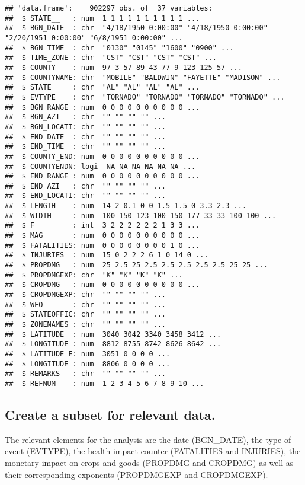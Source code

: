 \documentclass[
]{article}
\begin{document}
\begin{verbatim}
## 'data.frame':    902297 obs. of  37 variables:
##  $ STATE__   : num  1 1 1 1 1 1 1 1 1 1 ...
##  $ BGN_DATE  : chr  "4/18/1950 0:00:00" "4/18/1950 0:00:00" "2/20/1951 0:00:00" "6/8/1951 0:00:00" ...
##  $ BGN_TIME  : chr  "0130" "0145" "1600" "0900" ...
##  $ TIME_ZONE : chr  "CST" "CST" "CST" "CST" ...
##  $ COUNTY    : num  97 3 57 89 43 77 9 123 125 57 ...
##  $ COUNTYNAME: chr  "MOBILE" "BALDWIN" "FAYETTE" "MADISON" ...
##  $ STATE     : chr  "AL" "AL" "AL" "AL" ...
##  $ EVTYPE    : chr  "TORNADO" "TORNADO" "TORNADO" "TORNADO" ...
##  $ BGN_RANGE : num  0 0 0 0 0 0 0 0 0 0 ...
##  $ BGN_AZI   : chr  "" "" "" "" ...
##  $ BGN_LOCATI: chr  "" "" "" "" ...
##  $ END_DATE  : chr  "" "" "" "" ...
##  $ END_TIME  : chr  "" "" "" "" ...
##  $ COUNTY_END: num  0 0 0 0 0 0 0 0 0 0 ...
##  $ COUNTYENDN: logi  NA NA NA NA NA NA ...
##  $ END_RANGE : num  0 0 0 0 0 0 0 0 0 0 ...
##  $ END_AZI   : chr  "" "" "" "" ...
##  $ END_LOCATI: chr  "" "" "" "" ...
##  $ LENGTH    : num  14 2 0.1 0 0 1.5 1.5 0 3.3 2.3 ...
##  $ WIDTH     : num  100 150 123 100 150 177 33 33 100 100 ...
##  $ F         : int  3 2 2 2 2 2 2 1 3 3 ...
##  $ MAG       : num  0 0 0 0 0 0 0 0 0 0 ...
##  $ FATALITIES: num  0 0 0 0 0 0 0 0 1 0 ...
##  $ INJURIES  : num  15 0 2 2 2 6 1 0 14 0 ...
##  $ PROPDMG   : num  25 2.5 25 2.5 2.5 2.5 2.5 2.5 25 25 ...
##  $ PROPDMGEXP: chr  "K" "K" "K" "K" ...
##  $ CROPDMG   : num  0 0 0 0 0 0 0 0 0 0 ...
##  $ CROPDMGEXP: chr  "" "" "" "" ...
##  $ WFO       : chr  "" "" "" "" ...
##  $ STATEOFFIC: chr  "" "" "" "" ...
##  $ ZONENAMES : chr  "" "" "" "" ...
##  $ LATITUDE  : num  3040 3042 3340 3458 3412 ...
##  $ LONGITUDE : num  8812 8755 8742 8626 8642 ...
##  $ LATITUDE_E: num  3051 0 0 0 0 ...
##  $ LONGITUDE_: num  8806 0 0 0 0 ...
##  $ REMARKS   : chr  "" "" "" "" ...
##  $ REFNUM    : num  1 2 3 4 5 6 7 8 9 10 ...
\end{verbatim}

\hypertarget{create-a-subset-for-relevant-data.}{%
\subsection{Create a subset for relevant
data.}\label{create-a-subset-for-relevant-data.}}

The relevant elements for the analysis are the date (BGN\_DATE), the
type of event (EVTYPE), the health impact counter (FATALITIES and
INJURIES), the monetary impact on crops and goods (PROPDMG and CROPDMG)
as well as their corresponding exponents (PROPDMGEXP and CROPDMGEXP).
\end{document}
